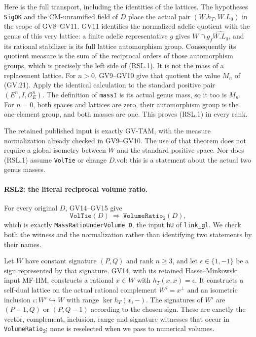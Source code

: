 Here is the full transport, including the identities of the lattices.
The hypotheses \texttt{SigOK} and the CM-unramified field of $D$
place the actual pair $(W.h_T,W.L_0)$ in the scope of GV8--GV11.
GV11 identifies the normalized adelic quotient with the genus of this
very lattice: a finite adelic representative $g$ gives
$W\cap g_f\widehat {W.L_0}$, and its rational stabilizer is its full
lattice automorphism group.  Consequently its quotient measure is
the sum of the reciprocal orders of those automorphism groups, which
is precisely the left side of (RSL.1).  It is not the mass of a
replacement lattice.  For $n>0$, GV9--GV10 give that quotient the
value $M_n$ of (GV.21).  Apply the identical calculation to the
standard positive pair $(E^n,I,\mathcal O_E^n)$.  The definition of
\texttt{massI} is its actual genus mass, so it too is $M_n$.
For $n=0$, both spaces and lattices are zero, their automorphism group
is the one-element group, and both masses are one.  This proves
(RSL.1) in every rank.

The retained published input is exactly GV-TAM, with the measure
normalization already checked in GV9--GV10.  The use of that theorem
does not require a global isometry between $W$ and the standard
positive space.  Nor does (RSL.1) assume \texttt{VolTie} or change
$D.\mathrm{vol}$: this is a statement about the actual two genus
masses.

\paragraph{RSL2: the literal reciprocal volume ratio.}
\label{claim:RSL2}
For every original $D$, GV14--GV15 give
\[
 \texttt{VolTie}(D)\ \Longrightarrow\ \texttt{VolumeRatio}_2(D),
                                                                  \tag{RSL.2}
\]
which is exactly \texttt{MassRatioUnderVolume D}, the input
\texttt{hU} of \texttt{link\_gl}.  We check both the witness and the
normalization rather than identifying two statements by their names.

Let $W$ have constant signature $(P,Q)$ and rank $n\ge3$, and let
$\epsilon\in\{1,-1\}$ be a sign represented by that signature.
GV14, with its retained Hasse--Minkowski input MF-HM, constructs a
rational $x\in W$ with $h_T(x,x)=\epsilon$.  It constructs a
self-dual lattice on the actual rational complement $W'=x^\perp$
and an isometric inclusion $\iota:W'\hookrightarrow W$ with range
$\ker h_T(x,-)$.  The signatures of $W'$ are $(P-1,Q)$ or
$(P,Q-1)$ according to the chosen sign.  These are exactly the
vector, complement, inclusion, range and signature witnesses that
occur in \texttt{VolumeRatio}\textsubscript{2}; none is reselected
when we pass to numerical volumes.

